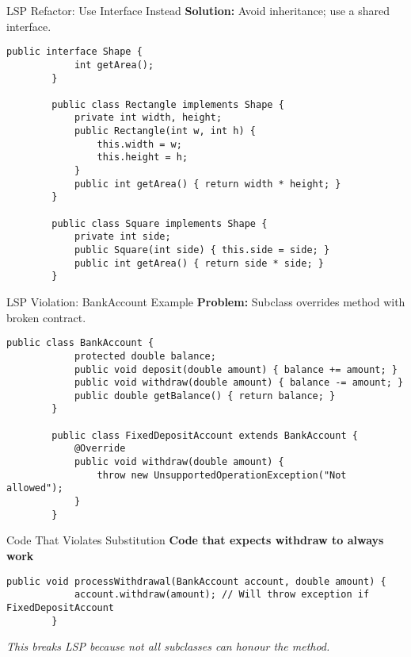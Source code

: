 \documentclass[aspectratio=169, table]{beamer}
\begin{document}
\begin{frame}[fragile]{LSP Refactor: Use Interface Instead}
	\vspace{20pt}
	\textbf{Solution:} Avoid inheritance; use a shared interface.
	
	\begin{lstlisting}[style=JavaStyle]
		public interface Shape {
			int getArea();
		}
		
		public class Rectangle implements Shape {
			private int width, height;
			public Rectangle(int w, int h) {
				this.width = w;
				this.height = h;
			}
			public int getArea() { return width * height; }
		}
		
		public class Square implements Shape {
			private int side;
			public Square(int side) { this.side = side; }
			public int getArea() { return side * side; }
		}
	\end{lstlisting}
\end{frame}

\begin{frame}[fragile]{LSP Violation: BankAccount Example}
	\vspace{20pt}
	\textbf{Problem:} Subclass overrides method with broken contract.
	
	\begin{lstlisting}[style=JavaStyle]
		public class BankAccount {
			protected double balance;
			public void deposit(double amount) { balance += amount; }
			public void withdraw(double amount) { balance -= amount; }
			public double getBalance() { return balance; }
		}
		
		public class FixedDepositAccount extends BankAccount {
			@Override
			public void withdraw(double amount) {
				throw new UnsupportedOperationException("Not allowed");
			}
		}
	\end{lstlisting}
\end{frame}

\begin{frame}[fragile]{Code That Violates Substitution}
	\vspace{20pt}
	\textbf{Code that expects withdraw to always work}
	
	\begin{lstlisting}[style=JavaStyle]
		public void processWithdrawal(BankAccount account, double amount) {
			account.withdraw(amount); // Will throw exception if FixedDepositAccount
		}
	\end{lstlisting}
	
	\textit{This breaks LSP because not all subclasses can honour the method.}
\end{frame}
\end{document}
